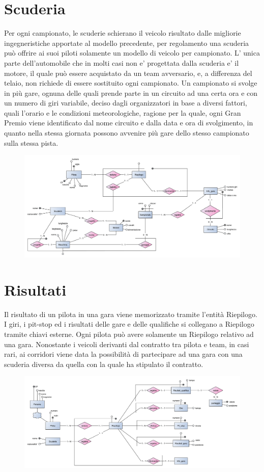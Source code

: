 \documentclass[a4paper,12pt]{report}
\begin{document}
		\section{Scuderia}
	Per ogni campionato, le scuderie schierano il veicolo risultato dalle migliorie ingegneristiche apportate al modello
	precedente, per regolamento una scuderia può offrire ai suoi piloti solamente un modello di veicolo per campionato.
	L' unica parte dell'automobile che in molti casi non e' progettata dalla scuderia e' il motore, il quale può essere
	acquistato da un team avversario, e, a differenza del telaio, non richiede di essere sostituito ogni campionato.
	Un campionato si svolge in più gare, ognuna delle quali prende parte in un circuito ad una certa ora e con un numero
	di giri variabile, deciso dagli organizzatori in base a diversi fattori, quali l'orario e le condizioni meteorologiche,
	ragione per la quale, ogni Gran Premio viene identificato dal nome circuito e dalla data e ora di svolgimento, in quanto
	nella stessa giornata possono avvenire più gare dello stesso campionato sulla stessa pista.
	\begin{figure}[htbp]
		\centering
		\includegraphics[scale=0.8]{copies/scheletro2.pdf}
	\end{figure}
		\section{Risultati}
	Il risultato di un pilota in una gara viene memorizzato tramite l'entità Riepilogo.
	I giri, i pit-stop ed i risultati delle gare e delle qualifiche si collegano a Riepilogo tramite chiavi esterne.
	Ogni pilota può avere solamente un Riepilogo relativo ad una gara.
	Nonostante i veicoli derivanti dal contratto tra pilota e team, in casi rari, ai corridori viene data la possibilità
	di partecipare ad una gara con una scuderia diversa da quella con la quale ha stipulato il contratto.
	\begin{figure}[htbp]
		\centering
		\includegraphics[scale=0.8]{copies/scheletro3.pdf}
	\end{figure}
\end{document}
